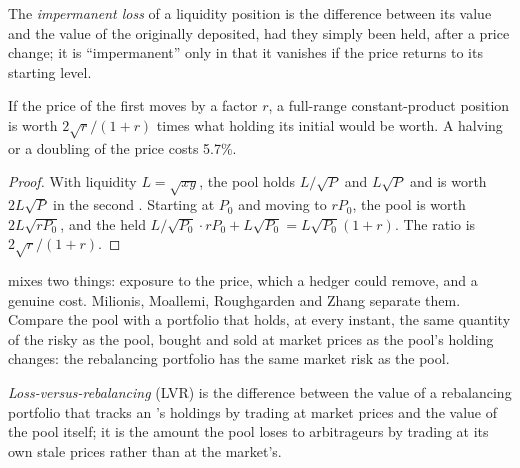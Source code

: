 \begin{definition}\label{def:m3:automated-market-makers:il}
The \emph{impermanent loss} of a liquidity position is the difference between its value and the value of the
 originally deposited, had they simply been held, after a price change; it is ``impermanent'' only in that it vanishes if the
price returns to its starting level.
\end{definition}

\begin{proposition}\label{prop:m3:automated-market-makers:il}
If the price of the first  moves by a factor $r$, a full-range constant-product position is worth $2\sqrt{r}/(1 + r)$ times what
holding its initial  would be worth. A halving or a doubling of the price costs 5.7\%.
\end{proposition}

\begin{proof}
With liquidity $L = \sqrt{xy}$, the pool holds $L/\sqrt{P}$ and $L\sqrt{P}$ and is worth $2L\sqrt{P}$ in the second . Starting at
$P_0$ and moving to $rP_0$, the pool is worth $2L\sqrt{rP_0}$, and the held  $L/\sqrt{P_0} \cdot rP_0 + L\sqrt{P_0} = L\sqrt{P_0}(1 +
r)$. The ratio is $2\sqrt{r}/(1 + r)$.
\end{proof}

 mixes two things: exposure to the price, which a hedger could remove, and a genuine cost. Milionis, Moallemi,
Roughgarden and Zhang separate them. Compare the pool with a portfolio that holds, at every instant, the same quantity of the risky
 as the pool, bought and sold at market prices as the pool's holding changes: the rebalancing portfolio has the same market risk
as the pool.

\begin{definition}\label{def:m3:automated-market-makers:lvr}
\emph{Loss-versus-rebalancing} (LVR) is the difference between the value of a rebalancing portfolio that
tracks an 's holdings by trading at market prices and the value of the pool itself; it is the amount the pool
loses to arbitrageurs by trading at its own stale prices rather than at the market's.
\end{definition}


